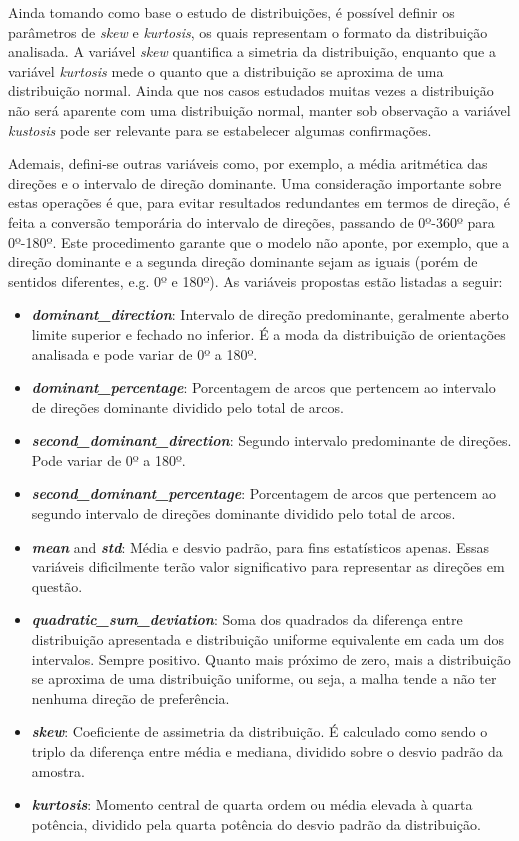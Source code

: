 Ainda tomando como base o estudo de distribuições, é possível definir os parâmetros de \textit{skew} e \textit{kurtosis}, os quais representam o formato da distribuição analisada.
A variável \textit{skew} quantifica a simetria da distribuição, enquanto que a variável \textit{kurtosis} mede o quanto que a distribuição se aproxima de uma distribuição normal.
Ainda que nos casos estudados muitas vezes a distribuição não será aparente com uma distribuição normal, manter sob observação a variável \textit{kustosis} pode ser relevante para se estabelecer algumas confirmações.

Ademais, defini-se outras variáveis como, por exemplo, a média aritmética das direções e o intervalo de direção dominante.
%
Uma consideração importante sobre estas operações é que, para evitar resultados redundantes em termos de direção, é feita a conversão temporária do intervalo de direções, passando de 0º-360º para 0º-180º.
Este procedimento garante que o modelo não aponte, por exemplo, que a direção dominante e a segunda direção dominante sejam as iguais (porém de sentidos diferentes, e.g. 0º e 180º).
%
As variáveis propostas estão listadas a seguir:

\begin{itemize}
    \item \textit{\textbf{dominant\_direction}}: Intervalo de direção predominante, geralmente aberto limite superior e fechado no inferior. É a moda da distribuição de orientações analisada e pode variar de 0º a 180º.
    \item \textit{\textbf{dominant\_percentage}}: Porcentagem de arcos que pertencem ao intervalo de direções dominante dividido pelo total de arcos.
    \item \textit{\textbf{second\_dominant\_direction}}: Segundo intervalo predominante de direções. Pode variar de 0º a 180º.
    \item \textit{\textbf{second\_dominant\_percentage}}: Porcentagem de arcos que pertencem ao segundo intervalo de direções dominante dividido pelo total de arcos.
    \item \textit{\textbf{mean}} and \textbf{\textit{std}}: Média e desvio padrão, para fins estatísticos apenas. Essas variáveis dificilmente terão valor significativo para representar as direções em questão.
    \item \textit{\textbf{quadratic\_sum\_deviation}}: Soma dos quadrados da diferença entre distribuição apresentada e distribuição uniforme equivalente em cada um dos intervalos. Sempre positivo. Quanto mais próximo de zero, mais a distribuição se aproxima de uma distribuição uniforme, ou seja, a malha tende a não ter nenhuma direção de preferência.
    \item \textit{\textbf{skew}}: Coeficiente de assimetria da distribuição. É calculado como sendo o triplo da diferença entre média e mediana, dividido sobre o desvio padrão da amostra.
    \item \textit{\textbf{kurtosis}}: Momento central de quarta ordem ou média elevada à quarta potência, dividido pela quarta potência do desvio padrão da distribuição. 
\end{itemize}

